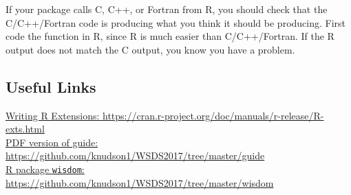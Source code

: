 \documentclass{article}
\begin{document}
If your package calls C, C++, or Fortran from R, you should check that the C/C++/Fortran code is producing what you think it should be producing. First code the function in R, since R is much easier than C/C++/Fortran. If the R output does not match the C output, you know you have a problem.

\subsection{Useful Links}
\noindent \href{https://cran.r-project.org/doc/manuals/r-release/R-exts.html}{Writing R Extensions: \url{https://cran.r-project.org/doc/manuals/r-release/R-exts.html}}\\

\noindent \href{https://github.com/knudson1/WSDS2017/tree/master/guide}{PDF version of guide: \url{https://github.com/knudson1/WSDS2017/tree/master/guide}}\\

\noindent \href{https://github.com/knudson1/WSDS2017/tree/master/wisdom}{ R package \texttt{wisdom}: \url{https://github.com/knudson1/WSDS2017/tree/master/wisdom}}
\end{document}
